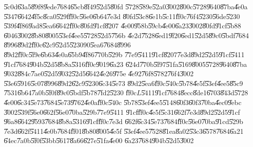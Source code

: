 \U{5c0d}\U{63a5}\U{89f8}\U{9ede}\U{7684}\U{65cb}\U{8f49}\U{52d5}\U{80fd}%
\U{5728}\U{589e}\U{52a0}\U{3002}\U{800c}\U{5728}\U{9640}\U{87ba}\U{4e0a}%
\U{5347}\U{6642}\U{4f5c}\U{8ca0}\U{529f}\U{ff0c}\U{56e0}\U{6b64}\U{7e3d}%
\U{80fd}\U{53c8}\U{6e1b}\U{5c11}\U{ff0c}\U{76f4}\U{5230}\U{56de}\U{5230}%
\U{539f}\U{4f86}\U{9ad8}\U{5ea6}\U{6642}\U{ff0c}\U{80fd}\U{91cf}\U{8207}%
\U{4e00}\U{958b}\U{59cb}\U{4e00}\U{6a23}\U{3002}\U{80fd}\U{91cf}\U{5b88}%
\U{6046}\U{3002}\U{8b80}\U{8005}\U{53ef}\U{4ee5}\U{5728}\U{52d5}\U{756b}%
\U{4e2d}\U{7528}\U{6ed1}\U{9f20}\U{6ed1}\U{52d5}\U{89c0}\U{5bdf}\U{7684}%
\U{8996}\U{89d2}\U{ff0c}\U{62c9}\U{52d5}\U{5230}$90$\U{5ea6}\U{7684}\U{8996}%
\U{89d2}\U{ff0c}\U{5f9e}\U{6b63}\U{4e0a}\U{65b9}\U{4f86}\U{770b}\U{529b}%
\U{77e9}\U{5411}\U{91cf}\U{8207}\U{7e3d}\U{89d2}\U{52d5}\U{91cf}\U{5411}%
\U{91cf}\U{7684}\U{904b}\U{52d5}\U{8b8a}\U{5316}\U{ff0c}\U{9019}\U{6a23}%
\U{624d}\U{770b}\U{5f97}\U{51fa}\U{5169}\U{8005}\U{5728}\U{9640}\U{87ba}%
\U{9032}\U{884c}\U{7ae0}\U{52d5}\U{9032}\U{52d5}\U{6642}\U{4e26}\U{975e}%
\U{4e92}\U{76f8}\U{5782}\U{76f4}\U{3002}\newline
\U{53e6}\U{5916}\U{5c07}\U{8996}\U{89d2}\U{62c9}\U{5230}\U{6c34}\U{5e73}%
\U{89d2}\U{5ea6}\U{ff0c}\U{540c}\U{5b78}\U{4e5f}\U{53ef}\U{4ee5}\U{85c9}%
\U{7531}\U{6b64}\U{7a0b}\U{5f0f}\U{89c0}\U{5bdf}\U{5b78}\U{7fd2}\U{5230}%
\U{ff0c}$L$\U{5411}\U{91cf}\U{7684}\U{8ecc}\U{8de1}\U{6703}\U{843d}\U{5728}%
\U{4e00}\U{6c34}\U{5e73}\U{7684}\U{5e73}\U{9762}\U{4e0a}\U{ff0c}\U{540c}%
\U{5b78}\U{53ef}\U{4ee5}\U{5148}\U{60f3}\U{60f3}\U{70ba}\U{4ec0}\U{9ebc}%
\U{3002}\U{539f}\U{56e0}\U{662f}\U{56e0}\U{70ba}\U{529b}\U{77e9}\U{5411}%
\U{91cf}\U{ff0c}\U{4e5f}\U{5c31}\U{662f}\U{7e3d}\U{89d2}\U{52d5}\U{91cf}%
\U{96a8}\U{6642}\U{9593}\U{7684}\U{8b8a}\U{5316}\U{91cf}\U{ff0c}\U{7e3d}%
\U{662f}\U{6c34}\U{5e73}\U{7684}\U{ff0c}\U{56e0}\U{70ba}\U{91cd}\U{529b}%
\U{7e3d}\U{662f}\U{5411}\U{4e0b}\U{7684}\U{ff01}\U{8b80}\U{8005}\U{4e5f}%
\U{53ef}\U{4ee5}\U{7528}\U{81ea}\U{8a02}\U{53c3}\U{6578}\U{7684}\U{6a21}%
\U{64ec}\U{7a0b}\U{5f0f}\U{53bb}\U{5617}\U{8a66}\U{627e}\U{51fa}\U{4e00}%
\U{6a23}\U{7684}\U{904b}\U{52d5}\U{3002}

